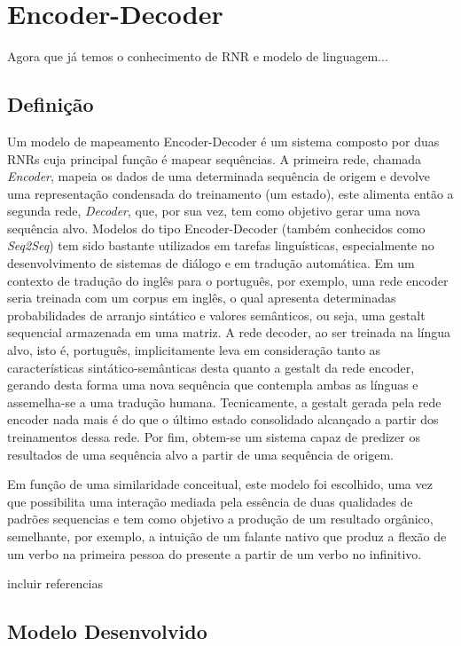 \chapter{Encoder-Decoder}
\label{ch:05}

Agora que já temos o conhecimento de RNR e modelo de linguagem...



\section{Definição}
Um modelo de mapeamento Encoder-Decoder é um sistema composto por duas RNRs cuja principal função é mapear sequências. A primeira rede, chamada \textit{Encoder}, mapeia os dados de uma determinada sequência de origem e devolve uma representação condensada do treinamento (um estado), este alimenta então a segunda rede, \textit{Decoder}, que, por sua vez, tem como objetivo gerar uma nova sequência alvo.  %
Modelos do tipo Encoder-Decoder (também conhecidos como \textit{Seq2Seq}) tem sido bastante utilizados em tarefas linguísticas, especialmente no desenvolvimento de sistemas de diálogo e em tradução automática. Em um contexto de tradução do inglês para o português, por exemplo, uma rede encoder seria treinada com um corpus em inglês, o qual apresenta determinadas probabilidades de arranjo sintático e valores semânticos, ou seja, uma gestalt sequencial armazenada em uma matriz. A rede decoder, ao ser treinada na língua alvo, isto é, português, implicitamente leva em consideração tanto as características sintático-semânticas desta quanto a gestalt da rede encoder, gerando desta forma uma nova sequência que contempla ambas as línguas e assemelha-se a uma tradução humana. Tecnicamente, a gestalt gerada pela rede encoder nada mais é do que o último estado consolidado alcançado a partir dos treinamentos dessa rede. Por fim, obtem-se um sistema capaz de predizer os resultados de uma sequência alvo a partir de uma sequência de origem.

Em função de uma similaridade conceitual, este modelo foi escolhido, uma vez que possibilita uma interação mediada pela essência de duas qualidades de padrões sequencias e tem como objetivo a produção de um resultado orgânico, semelhante, por exemplo, a intuição de um falante nativo que produz a flexão de um verbo na primeira pessoa do presente a partir de um verbo no infinitivo. 

incluir referencias

\section{Modelo Desenvolvido}

